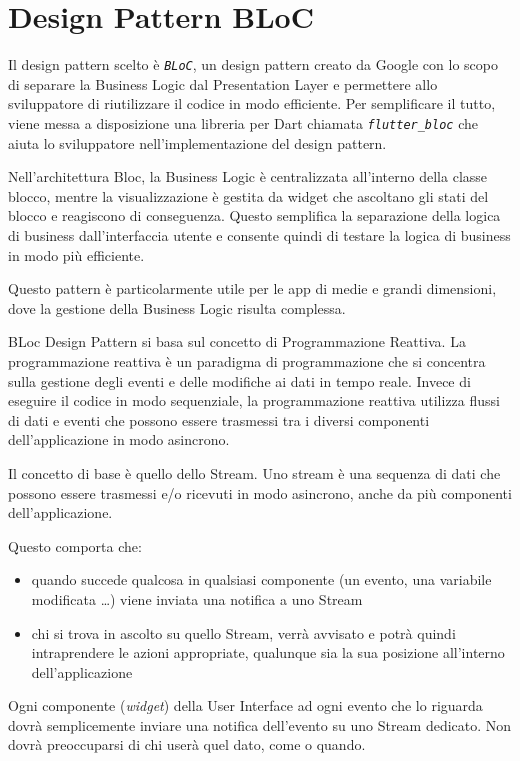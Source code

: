 \documentclass[a4paper, oneside, 12pt]{book}
\begin{document}
\newpage
\section{Design Pattern BLoC}
Il design pattern scelto è \textit{\texttt{BLoC}}, un design pattern creato da Google con lo scopo di separare la Business Logic dal Presentation Layer 
e permettere allo sviluppatore di riutilizzare il codice in modo efficiente. Per semplificare il tutto, viene messa a disposizione una libreria 
per Dart chiamata \textit{\texttt{flutter\_bloc}} che aiuta lo sviluppatore nell'implementazione del design pattern.

Nell'architettura Bloc, la Business Logic è centralizzata all'interno della classe blocco, mentre la visualizzazione è gestita da widget che ascoltano 
gli stati del blocco e reagiscono di conseguenza. Questo semplifica la separazione della logica di business dall'interfaccia utente e consente quindi 
di testare la logica di business in modo più efficiente. 

Questo pattern è particolarmente utile per le app di medie e grandi dimensioni, dove la gestione della Business Logic risulta complessa. 

BLoc Design Pattern si basa sul concetto di Programmazione Reattiva. La programmazione reattiva è un paradigma di programmazione che si concentra 
sulla gestione degli eventi e delle modifiche ai dati in tempo reale. Invece di eseguire il codice in modo sequenziale, la programmazione reattiva 
utilizza flussi di dati e eventi che possono essere trasmessi tra i diversi componenti dell'applicazione in modo asincrono. 

Il concetto di base è quello dello Stream. Uno stream è una sequenza di dati che possono essere trasmessi e/o ricevuti in modo asincrono,
anche da più componenti dell'applicazione.

Questo comporta che:
\begin{itemize}
	\item quando succede qualcosa in qualsiasi componente (un evento, una variabile modificata \ldots) viene inviata una notifica a uno Stream
	\item chi si trova in ascolto su quello Stream, verrà avvisato e potrà quindi intraprendere le azioni appropriate, qualunque sia la sua posizione all'interno dell'applicazione
\end{itemize}

Ogni componente (\textit{widget}) della User Interface ad ogni evento che lo riguarda dovrà semplicemente inviare una notifica dell'evento su uno Stream dedicato. 
Non dovrà preoccuparsi di chi userà quel dato, come o quando.
\end{document}
